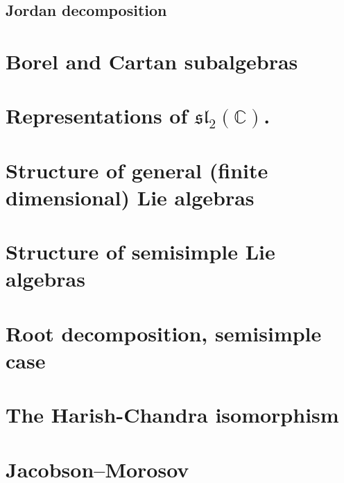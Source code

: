 \subsection{Jordan decomposition}




\section{Borel and Cartan subalgebras}


\section{Representations of $\mathfrak{sl}_2(\mathbb C)$.}




\section{Structure of general (finite dimensional) Lie algebras}



\section{Structure of semisimple Lie algebras}



\section{Root decomposition, semisimple case}






\section{The Harish-Chandra isomorphism}


\section{Jacobson--Morosov}












